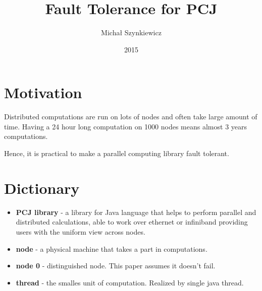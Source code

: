 \documentclass[12pt]{article}
\begin{document}
\title{Fault Tolerance for PCJ}

\author{Michał Szynkiewicz}
\date{2015}
\maketitle

\section{Motivation}

Distributed computations are run on lots of nodes and often take large amount of time.
Having a 24 hour long computation on 1000 nodes means almost 3 years computations.

Hence, it is practical to make a parallel computing library fault tolerant.

\section{Dictionary}
\begin{itemize}
\item \textbf{PCJ library} - a library for Java language that helps to perform parallel and distributed calculations, able to work over ethernet or infiniband providing users with the uniform view across nodes.

\item \textbf{node} - a physical machine that takes a part in computations.

\item \textbf{node 0} - distinguished node. This paper assumes it doesn't fail.

\item \textbf{thread} - the smalles unit of computation. Realized by single java thread.
\end{itemize}
\end{document}
